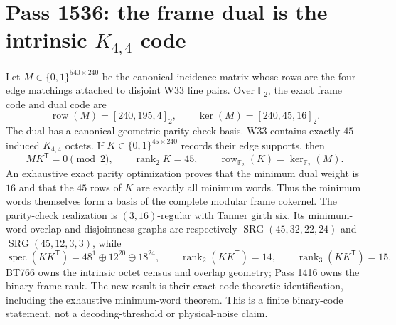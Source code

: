 \section*{Pass 1536: the frame dual is the intrinsic $K_{4,4}$ code}
Let $M\in\{0,1\}^{540\times240}$ be the canonical incidence matrix whose rows
are the four-edge matchings attached to disjoint W33 line pairs. Over
$\mathbb F_2$, the exact frame code and dual code are
\[
 \operatorname{row}(M)=[240,195,4]_2,
 \qquad
 \ker(M)=[240,45,16]_2.
\]
The dual has a canonical geometric parity-check basis. W33 contains exactly
$45$ induced $K_{4,4}$ octets. If $K\in\{0,1\}^{45\times240}$ records their
edge supports, then
\[
 MK^{\mathsf T}=0\pmod2,
 \qquad
 \operatorname{rank}_{2}K=45,
 \qquad
 \operatorname{row}_{\mathbb F_2}(K)=\ker_{\mathbb F_2}(M).
\]
An exhaustive exact parity optimization proves that the minimum dual weight is
$16$ and that the $45$ rows of $K$ are exactly all minimum words. Thus the
minimum words themselves form a basis of the complete modular frame cokernel.
The parity-check realization is $(3,16)$-regular with Tanner girth six. Its
minimum-word overlap and disjointness graphs are respectively
$\operatorname{SRG}(45,32,22,24)$ and $\operatorname{SRG}(45,12,3,3)$, while
\[
 \operatorname{spec}(KK^{\mathsf T})=48^1\oplus12^{20}\oplus18^{24},
 \qquad
 \operatorname{rank}_{2}(KK^{\mathsf T})=14,
 \qquad
 \operatorname{rank}_{3}(KK^{\mathsf T})=15.
\]
BT766 owns the intrinsic octet census and overlap geometry; Pass 1416 owns the
binary frame rank. The new result is their exact code-theoretic identification,
including the exhaustive minimum-word theorem. This is a finite binary-code
statement, not a decoding-threshold or physical-noise claim.
